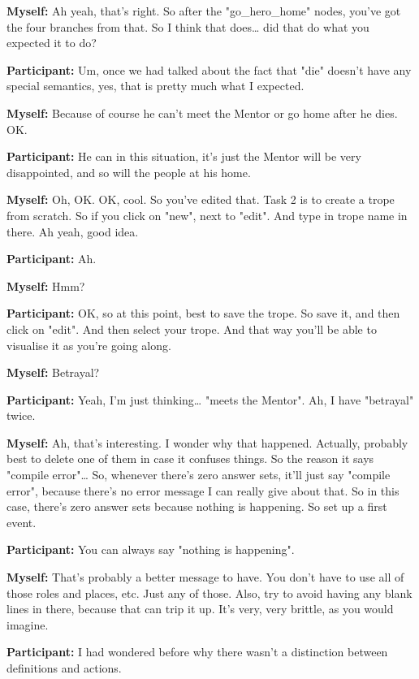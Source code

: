\documentclass[11pt]{report}
\begin{document}
\begin{linenumbers}
\textbf{Myself:} Ah yeah, that's right. So after the "go_hero_home" nodes, you've got the four branches from that. So I think that does\ldots{} did that do what you expected it to do?

\textbf{Participant:} Um, once we had talked about the fact that "die" doesn't have any special semantics, yes, that is pretty much what I expected.

\textbf{Myself:} Because of course he can't meet the Mentor or go home after he dies. OK.

\textbf{Participant:} He can in this situation, it's just the Mentor will be very disappointed, and so will the people at his home.

\textbf{Myself:} Oh, OK. OK, cool. So you've edited that. Task 2 is to create a trope from scratch. So if you click on "new", next to "edit". And type in trope name in there. Ah yeah, good idea.

\textbf{Participant:} Ah.

\textbf{Myself:} Hmm?

\textbf{Participant:} OK, so at this point, best to save the trope. So save it, and then click on "edit". And then select your trope. And that way you'll be able to visualise it as you're going along.

\textbf{Myself:} Betrayal?

\textbf{Participant:} Yeah, I'm just thinking\ldots{} "meets the Mentor". Ah, I have "betrayal" twice.

\textbf{Myself:} Ah, that's interesting. I wonder why that happened. Actually, probably best to delete one of them in case it confuses things. So the reason it says "compile error"\ldots{} So, whenever there's zero answer sets, it'll just say "compile error", because there's no error message I can really give about that. So in this case, there's zero answer sets because nothing is happening. So set up a first event.

\textbf{Participant:} You can always say "nothing is happening".

\textbf{Myself:} That's probably a better message to have. You don't have to use all of those roles and places, etc. Just any of those. Also, try to avoid having any blank lines in there, because that can trip it up. It's very, very brittle, as you would imagine.

\textbf{Participant:} I had wondered before why there wasn't a distinction between definitions and actions.


\end{linenumbers}
\end{document}
